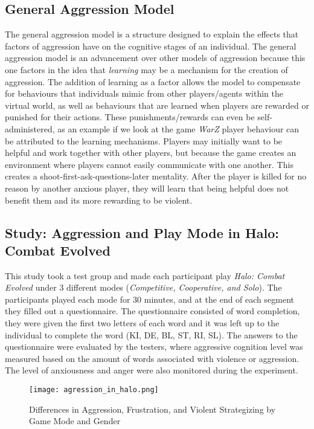 \documentclass[12pt]{report}
\begin{document}
\subsection{General Aggression Model}
The general aggression model is a structure designed to explain the effects that factors of aggression have on the cognitive stages of an individual. The general aggression model is an advancement over other models of aggression because this one factors in the idea that \textit{learning} may be a mechanism for the creation of aggression.\cite{Killing_Spree} The addition of learning as a factor allows the model to compensate for behaviours that individuals mimic from other players/agents within the virtual world, as well as behaviours that are learned when players are rewarded or punished for their actions. These punishments/rewards can even be self-administered, as an example if we look at the game \textit{WarZ} player behaviour can be attributed to the learning mechanisms. Players may initially want to be helpful and work together with other players, but because the game creates an environment where players cannot easily communicate with one another. This creates a shoot-first-ask-questions-later mentality. After the player is killed for no reason by another anxious player, they will learn that being helpful does not benefit them and its more rewarding to be violent.

\subsection{Study: Aggression and Play Mode in Halo: Combat Evolved\cite{Killing_Spree}}
This study took a test group and made each participant play \textit{Halo: Combat Evolved} under 3 different modes (\textit{Competitive, Cooperative, and Solo}). The participants played each mode for 30 minutes, and at the end of each segment they filled out a questionnaire. The questionnaire consisted of word completion, they were given the first two letters of each word and it was left up to the individual to complete the word (KI, DE, BL, ST, RI, SL). The answers to the questionnaire were evaluated by the testers, where aggressive cognition level was measured based on the amount of words associated with violence or aggression. The level of anxiousness and anger were also monitored during the experiment.

\begin{figure}[h]
\begin{center}
\leavevmode
\texttt{[image: agression\_in\_halo.png]}
\end{center}
\caption{Differences in Aggression, Frustration, and Violent Strategizing by Game Mode and Gender \cite{Killing_Spree}}
\label{fig:agg_in_halo}
\end{figure}
\end{document}
